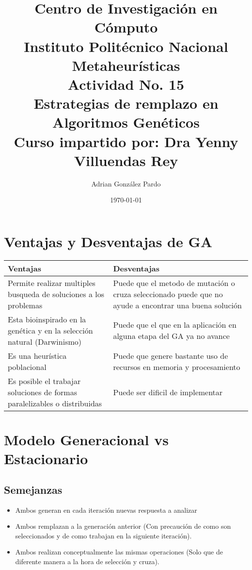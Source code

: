 \documentclass[10pt]{article}
\title{Centro de Investigación en Cómputo\\Instituto Politécnico Nacional\\Metaheurísticas\\Actividad No. 15\\Estrategias de remplazo en Algoritmos Genéticos\\Curso impartido por: Dra Yenny Villuendas Rey}
\author{Adrian González Pardo}
\date{\today}
\begin{document}
\maketitle
\section{Ventajas y Desventajas de GA}
\begin{center}
  \begin{tabular}{|p{6cm}|p{6cm}|}
    \hline
    Ventajas & Desventajas \\
    \hline
    Permite realizar multiples busqueda de soluciones a los problemas & Puede que el metodo de mutación o cruza seleccionado puede que no ayude a encontrar una buena solución\\
    \hline
    Esta bioinspirado en la genética y en la selección natural (Darwinismo) & Puede que el que en la aplicación en alguna etapa del GA ya no avance \\
    \hline
    Es una heurística poblacional & Puede que genere bastante uso de recursos en memoria y procesamiento \\
    \hline
    Es posible el trabajar soluciones de formas paralelizables o distribuidas&Puede ser dificil de implementar\\
    \hline
  \end{tabular}
\end{center}
\section{Modelo Generacional vs Estacionario}
\subsection{Semejanzas}
\begin{itemize}
  \item Ambos generan en cada iteración nuevas respuesta a analizar
  \item Ambos remplazan a la generación anterior (Con precaución de como son seleccionados y de como trabajan en la siguiente iteración).
  \item Ambos realizan conceptualmente las mismas operaciones (Solo que de diferente manera a la hora de selección y cruza).
\end{itemize}
\end{document}
